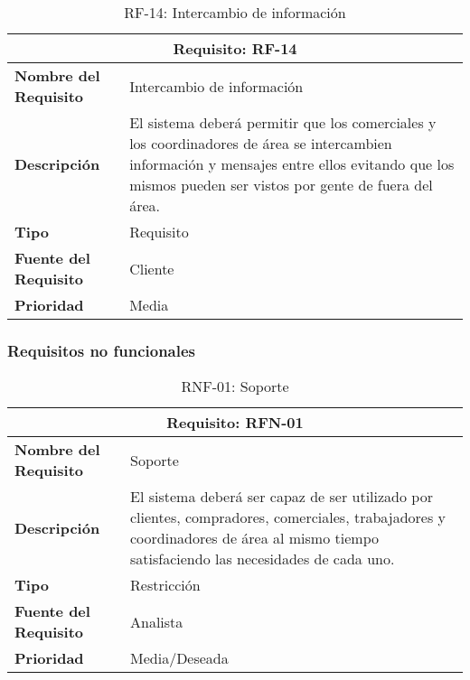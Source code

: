 \begin{table}[H]
\begin{center}
\begin{tabular}{p{} p{7cm}}
\multicolumn{2}{c}{\textbf{Requisito: RF-14} } \\
\hline \hline
\textbf{Nombre del Requisito} & Intercambio de información  \\
\hline
\textbf{Descripción} & El sistema deberá permitir que los comerciales y los coordinadores de área se intercambien información y mensajes entre ellos evitando que los mismos pueden ser vistos por gente de fuera del área. \\
\hline
\textbf{Tipo} & Requisito  \\
\hline
\textbf{Fuente del Requisito} & Cliente  \\
\hline
\textbf{Prioridad} & Media  \\ \hline
\end{tabular}
\caption{RF-14: Intercambio de información}
\label{tab:RF-14}
\end{center}
\end{table}



\newpage
\subsubsection{Requisitos no funcionales}

\begin{table}[H]
\begin{center}
\begin{tabular}{p{} p{7cm}}
\multicolumn{2}{c}{\textbf{Requisito: RFN-01} } \\
\hline \hline
\textbf{Nombre del Requisito} & Soporte  \\
\hline
\textbf{Descripción} & El sistema deberá ser capaz de ser utilizado por clientes, compradores, comerciales, trabajadores y coordinadores de área al mismo tiempo satisfaciendo las necesidades de cada uno. \\
\hline
\textbf{Tipo} & Restricción \\
\hline
\textbf{Fuente del Requisito} &  Analista \\
\hline
\textbf{Prioridad} &  Media/Deseada \\ \hline
\end{tabular}
\caption{RNF-01: Soporte}
\label{tab:RFN-01}
\end{center}
\end{table}


